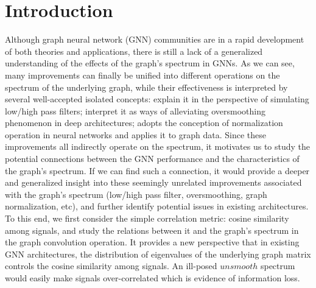 \documentclass[nohyperref]{article}
\theoremstyle{plain}
\theoremstyle{definition}
\theoremstyle{remark}
\begin{document}
\section{Introduction}
Although graph neural network (GNN) communities are in a rapid development of both theories and applications, there is still a lack of a generalized understanding of the effects of the graph's spectrum in GNNs. As we can see, many improvements can finally be unified into different operations on the spectrum of the underlying graph, while their effectiveness is interpreted by several well-accepted isolated concepts: \cite{pmlr-v97-wu19e,zhu2021interpreting,klicpera_predict_2019,klicpera2019diffusion,chien2021adaptive,balcilar2021analyzing} explain it in the perspective of simulating low/high pass filters; \cite{chenWHDL2020gcnii,xu2018representation,liu2020towards,li2018deeper} interpret it as ways of alleviating oversmoothing phenomenon in deep architectures; \cite{cai2020graphnorm} adopts the conception of normalization operation in neural networks and applies it to graph data.
Since these improvements all indirectly operate on the spectrum,
it motivates us to study the potential connections between the GNN performance and the characteristics of the graph's spectrum. If we can find such a connection, it would provide a deeper and generalized insight into these seemingly unrelated improvements associated with the graph's spectrum (low/high pass filter, oversmoothing, graph normalization, etc), and further identify potential issues in existing architectures.
To this end, we first consider the simple correlation metric: cosine similarity among signals, and study the relations between it and the graph's spectrum in the graph convolution operation. It provides a new perspective that in existing GNN architectures, the distribution of eigenvalues of the underlying graph matrix controls the cosine similarity among signals. An ill-posed $unsmooth$ spectrum would easily make signals over-correlated which is evidence of information loss.
\end{document}
